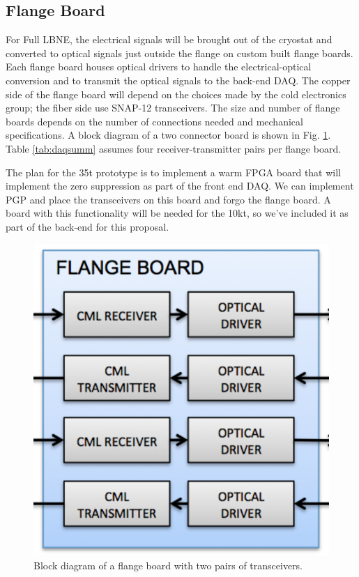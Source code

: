 \subsection{Flange Board}

For Full LBNE, the electrical signals will be brought out of the cryostat and converted to optical signals just outside the flange on custom built flange boards.   Each flange board houses optical drivers to handle the electrical-optical conversion and to transmit the optical signals to the  back-end DAQ.  The copper side of the flange board will depend on the choices made by the cold electronics group; the fiber side use SNAP-12 transceivers.  The size and number of flange boards depends on the number of connections needed and mechanical specifications.  A block diagram of a two connector board is shown in Fig. \ref{fig:flange}.  Table \ref{tab:daqsumm} assumes four receiver-transmitter pairs per flange board.  

The plan for the 35t prototype is to implement a warm FPGA board that will implement the zero suppression as part of the front end DAQ.  We can implement PGP and place the transceivers on this board and forgo the flange board.  A board with this functionality will be needed for the 10kt, so we've included it as part of the back-end for this proposal.  


\begin{figure}[htb]
\includegraphics[scale=0.6]{flange-board.pdf}
\caption{Block diagram of a flange board with two pairs of transceivers.}
\label{fig:flange}
\end{figure} 


